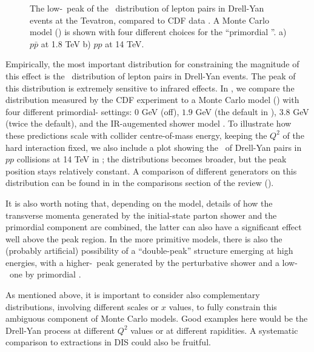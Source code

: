 \begin{figure}[tp]
  \caption{The low-\pt\ peak of the \pt\ distribution of lepton pairs
  in Drell-Yan events at the Tevatron, compared to CDF
  data \cite{Affolder:1999jh}. 
  A Monte Carlo model
  (\herwigpp) is shown with four different choices for the
  ``primordial \kT''. a) $p\bar p$ at 1.8 TeV b) $pp$ at
  14 TeV.
\label{fig:primkt}}
\end{figure}
Empirically, the most important distribution for constraining the
magnitude of this effect is the \pt\ distribution of lepton pairs
in Drell-Yan events. The peak of this distribution is extremely
sensitive to infrared effects. In , we
compare the distribution measured by the CDF
experiment \cite{Affolder:1999jh} 
to  a Monte Carlo model (\herwigpp) with four different primordial-\kT
settings: $0$ GeV (off), 
          $1.9$ GeV (the default in \herwigpp), 
          $3.8$ GeV (twice the default), 
          and the IR-augemented shower
          model \cite{Gieseke:2007ad}. 
To illustrate how these predictions scale with  collider centre-of-mass energy,
keeping the $Q^2$ of the hard interaction fixed, we also include a
plot showing the \pt\ of Drell-Yan pairs in $pp$ collisions at 14 TeV
in ; the distributions becomes broader, but the
peak position stays relatively constant. A comparison of different
generators on this distribution can be found
in  in the comparisons section of the
review (). 

It is also worth noting that, depending on the model, details of how
the transverse momenta generated by the initial-state parton shower
and the primordial component are combined, the latter can also have a
significant effect well above the peak region. In the more primitive
models, there is also the (probably artificial) possibility of a
``double-peak'' structure emerging at high energies, with a
higher-\pt\ peak generated by the perturbative shower and a low-\pt\
one by primordial \kT. 

As mentioned above, it is important to consider also
complementary distributions, involving different scales or $x$
values, to fully constrain this ambiguous component of Monte Carlo
models. Good examples here would be the Drell-Yan process at different $Q^2$
values or at different rapidities. A systematic comparison to
extractions in DIS could also be fruitful. 


